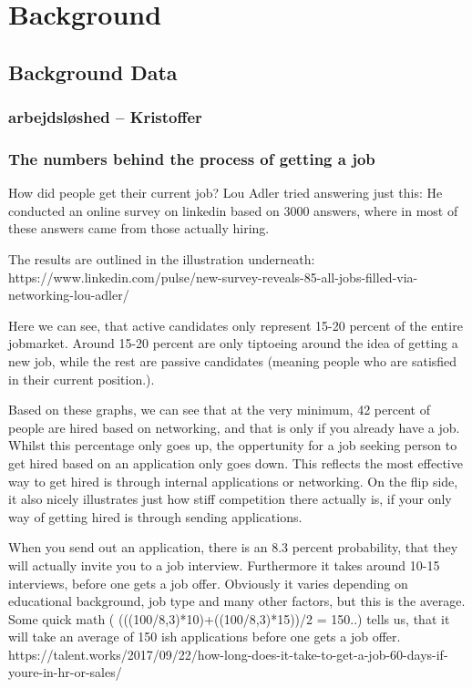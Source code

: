 \section{Background}\label{sec:background}

\subsection{Background Data}

\subsubsection{arbejdsløshed -- Kristoffer}


\subsubsection{The numbers behind the process of getting a job}
How did people get their current job?
Lou Adler tried answering just this: He conducted an online survey
on linkedin based on 3000 answers, where in most of these answers
came from those actually hiring.

The results are outlined in the illustration underneath:
https://www.linkedin.com/pulse/new-survey-reveals-85-all-jobs-filled-via-networking-lou-adler/

Here we can see, that active candidates only represent 15-20 percent of the
entire jobmarket. Around 15-20 percent are only tiptoeing around the idea
of getting a new job, while the rest are passive candidates (meaning people who are
satisfied in their current position.).

Based on these graphs, we can see that at the very minimum, 42 percent of people are
hired based on networking, and that is only if you already have a job.
Whilst this percentage only goes up, the oppertunity for a job seeking person
to get hired based on an application only goes down. This reflects the
most effective way to get hired is through internal applications or networking.
On the flip side, it also nicely illustrates just how stiff competition there actually is,
if your only way of getting hired is through sending applications.

When you send out an application, there is an 8.3 percent probability, that
they will actually invite you to a job interview. Furthermore it takes around
10-15 interviews, before one gets a job offer. Obviously it varies depending
on educational background, job type and many other factors, but this is the average.
Some quick math ( (((100/8,3)*10)+((100/8,3)*15))/2 = 150..) tells us, that it will
take an average of 150 ish applications before one gets a job offer.
https://talent.works/2017/09/22/how-long-does-it-take-to-get-a-job-60-days-if-youre-in-hr-or-sales/

